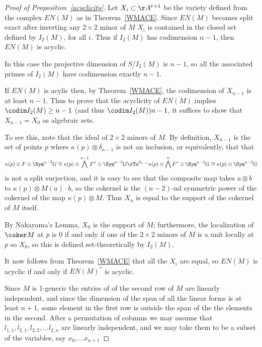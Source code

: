 \begin{proof}[Proof of Proposition~\ref{acyclicity}]
Let $X_{i}\subset \AA^{r+1}$ be the variety defined from the complex $EN(M)$ as in 
Theorem~\ref{WMACE}. Since $EN(M)$ becomes split exact after inverting any $2\times 2$ minor of $M$
$X_{i}$ is
contained in the closed set defined by $I_{2}(M)$, for all $i$. Thus if $I_{2}(M)$ has codimension $n-1$,
then $EN(M)$ is acyclic. 

In this case the projective dimension
of $S/I_{2}(M)$ is $n-1$, so all the associated primes of $I_{2}(M)$ have codimension
exactly $n-1$.

If $EN(M)$ is  acylic then, by Theorem~\ref{WMACE}, the codimension of $X_{n-1}$ is at least $n-1$. Thus to prove that the acyclicity of $EN(M)$ implies  $\codim I_{2}(M) \geq n-1$ (and thus
$\codim I_{2}(M))  n-1$, it suffices to show that $X_{n-1} = X_{0}$ as algebraic sets.

To see this, note that
the ideal of $2\times 2$ minors of $M$. By definition, $X_{n-1}$ 
is the set of points $p$ where $\kappa(p)\otimes \delta_{n-1}$ is not an inclusion, 
or equivalently, that 
that 
$$
\kappa(p)\otimes F\otimes \Sym^{n-3}G 
\cong 
\kappa(p)\otimes \bigwedge^{n-1} F^{*} \otimes  \Sym^{n-3}G 
\rTo^{\partial_{n-1}}
\kappa(p)\otimes \bigwedge^{n} F^{*} \otimes  \Sym^{n-2}G
\cong
\kappa(p)\otimes \Sym^{n-2}G
$$
is not a split surjection, and it is easy to see that the composite map takes
$a\otimes b$ to $\kappa(p) \otimes M(a)\cdot b$, so the cokernel is the $(n-2)$-nd symmetric power
of the cokernel of the map $\kappa(p) \otimes M$. Thus $X_{n}$ is equal to the support
of the cokernel of $M$ itself. 

By Nakayama's Lemma, $X_{0}$ is the support of $M$; furthermore, the localization of $\coker M$ at $p$ is 0 if and only if
one of the 
$2\times 2$ minors of $M$ is a unit locally at $p$ so $X_{0}$, so this is defined
set-theoretically by $I_{2}(M)$.

It now follows from Theorem~\ref{WMACE} that all the $X_{i}$ are equal, so $EN(M)$ is 
acyclic if and only if $EN(M)^{*}$ is acyclic. 

Since $M$ is 1-generic the entries of of the second row of $M$ are linearly independent, and since the dimension of the span of all the linear forms is at least $n+1$, some element in the first row is outside the span of the the elements in the second. After a permutation of columns we may assume that $l_{1,1}, l_{2,1}, l_{2,2},\dots l_{2,n}$ are linearly independent, and we may take them to be a subset of the variables, say $x_{0},\dots x_{n+1}$


\end{proof}
